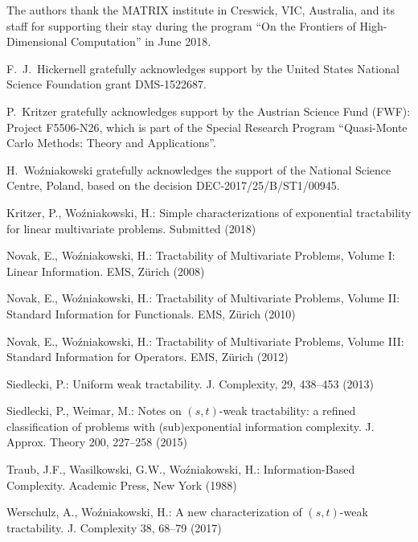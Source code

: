\documentclass[graybox]{svmult}
\begin{document}
%
\begin{acknowledgement}
The authors thank the MATRIX institute in Creswick, VIC, Australia, and its staff for supporting their 
stay during the program ``On the Frontiers of High-Dimensional Computation'' in June 2018. 

F.~J.~Hickernell gratefully acknowledges support by the United States National Science Foundation grant DMS-1522687.

P.~Kritzer gratefully acknowledges support by the Austrian Science Fund (FWF): Project F5506-N26, which is part
of the Special Research Program ``Quasi-Monte Carlo Methods: Theory and Applications''. 

H.~Wo\'{z}niakowski gratefully acknowledges the support of the National Science Centre, Poland, based on the decision 
DEC-2017/25/B/ST1/00945.
\end{acknowledgement}
%



\begin{thebibliography}{99.}%

 Kritzer, P., Wo\'{z}niakowski, H.: Simple characterizations of exponential tractability   
for linear multivariate problems. Submitted (2018)

Novak, E., Wo\'zniakowski, H.: Tractability    
of Multivariate Problems, Volume I: Linear Information. EMS, Z\"urich (2008)   
   
Novak, E., Wo\'zniakowski, H.: Tractability    
of Multivariate Problems, Volume II: Standard Information    
for Functionals. EMS, Z\"urich (2010)   
   
Novak, E., Wo\'zniakowski, H.: Tractability    
of Multivariate Problems, Volume III:    
Standard Information for Operators. EMS, Z\"urich (2012)   

Siedlecki, P.: Uniform weak tractability.   
J. Complexity, 29, 438--453 (2013)   

 Siedlecki, P., Weimar, M.: Notes on $(s,t)$-weak tractability: 
a refined classification of problems with (sub)exponential information complexity.
J. Approx. Theory 200, 227--258 (2015) 

Traub, J.F., Wasilkowski, G.W., Wo\'zniakowski, H.:   
Information-Based Complexity. Academic Press, New York (1988)   

 Werschulz, A., Wo\'{z}niakowski, H.: A new    
characterization of $(s,t)$-weak tractability. J. Complexity 38, 68--79 (2017) 

\end{thebibliography}
\end{document}
